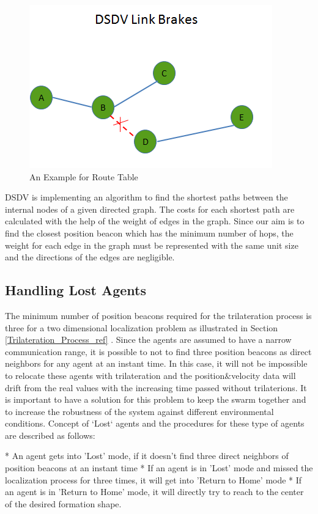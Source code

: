 \begin{figure}[H]
\caption{An Example for Route Table} \label{linkk_brake}
\centering
\includegraphics[scale = 0.65]{link_break}
\end{figure}
	
DSDV is implementing an algorithm to find the shortest paths between the internal nodes of a given directed graph. The costs for each shortest path are calculated with the help of the weight of edges in the graph. Since our aim is to find the closest position beacon which has the minimum number of hops, the weight for each edge in the graph must be represented with the same unit size and the directions of the edges are negligible. 

	
\subsection{Handling Lost Agents} \label{LostAgents}
The minimum number of position beacons required for the trilateration process is three for a two dimensional localization problem as illustrated in Section \ref{Trilateration_Process_ref} . Since the agents are assumed to have a narrow communication range, it is possible to not to find three  position beacons as direct neighbors for any agent at an instant time. In this case, it will not be impossible to relocate these agents with trilateration and the position$\&$velocity data will drift from the real values with the increasing time passed without trilaterions. It is important to have a solution for this problem to keep the swarm together and to increase the robustness of the system against different environmental conditions. Concept of `Lost` agents and the procedures for these type of agents are described as follows:
	
	* An agent gets into 'Lost' mode, if it doesn't find three direct neighbors of position beacons at an instant time \newline
	* If an agent is in 'Lost' mode and missed the localization process for three times, it will get into 'Return to Home' mode \newline
	* If an agent is in 'Return to Home' mode, it will directly try to reach to the center of the desired formation shape.
		
